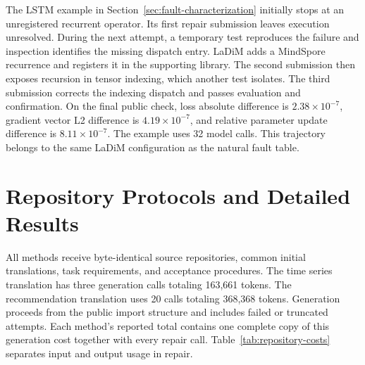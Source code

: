 \documentclass{article}
\begin{document}
The LSTM example in Section~\ref{sec:fault-characterization} initially stops at an unregistered recurrent operator. Its first repair submission leaves execution unresolved. During the next attempt, a temporary test reproduces the failure and inspection identifies the missing dispatch entry. LaDiM adds a MindSpore recurrence and registers it in the supporting library. The second submission then exposes recursion in tensor indexing, which another test isolates. The third submission corrects the indexing dispatch and passes evaluation and confirmation. On the final public check, loss absolute difference is $2.38\times10^{-7}$, gradient vector L2 difference is $4.19\times10^{-7}$, and relative parameter update difference is $8.11\times10^{-7}$. The example uses 32 model calls. This trajectory belongs to the same LaDiM configuration as the natural fault table.

\section{Repository Protocols and Detailed Results}
\label{sec:repository-results}

All methods receive byte-identical source repositories, common initial translations, task requirements, and acceptance procedures. The time series translation has three generation calls totaling 163,661 tokens. The recommendation translation uses 20 calls totaling 368,368 tokens. Generation proceeds from the public import structure and includes failed or truncated attempts. Each method's reported total contains one complete copy of this generation cost together with every repair call. Table~\ref{tab:repository-costs} separates input and output usage in repair.
\end{document}
